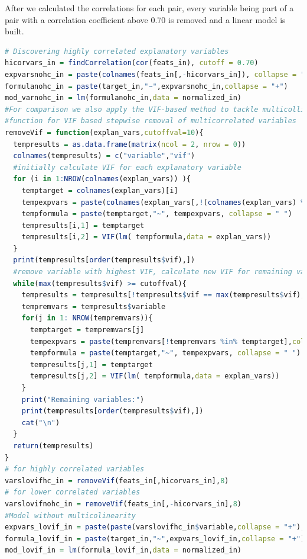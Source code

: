 \documentclass[12pt,a4paper,english]{article}
\begin{document}
After we calculated the correlations for each pair, every variable being part of a pair with a correlation coefficient above 0.70 is removed and a linear model is built.
\begin{lstlisting}[language= R, captionpos=b,caption=\href{https://github.com/jaidikam/sps_ws1718/tree/master/Qfolder3}{SPL\_Q3\_india\_impvar\_vif}]
# Discovering highly correlated explanatory variables
hicorvars_in = findCorrelation(cor(feats_in), cutoff = 0.70)
expvarsnohc_in = paste(colnames(feats_in[,-hicorvars_in]), collapse = "+")
formulanohc_in = paste(target_in,"~",expvarsnohc_in,collapse = "+")
mod_varnohc_in = lm(formulanohc_in,data = normalized_in)
#For comparison we also apply the VIF-based method to tackle multicollinearity:
#function for VIF based stepwise removal of multicorrelated variables
removeVif = function(explan_vars,cutoffval=10){
  tempresults = as.data.frame(matrix(ncol = 2, nrow = 0))
  colnames(tempresults) = c("variable","vif")
  #initially calculate VIF for each explanatory variable
  for (i in 1:NROW(colnames(explan_vars)) ){
    temptarget = colnames(explan_vars)[i]
    tempexpvars = paste(colnames(explan_vars[,!(colnames(explan_vars) %in% temptarget)]),collapse = "+")
    tempformula = paste(temptarget,"~", tempexpvars, collapse = " ")
    tempresults[i,1] = temptarget 
    tempresults[i,2] = VIF(lm( tempformula,data = explan_vars))
  }
  print(tempresults[order(tempresults$vif),])
  #remove variable with highest VIF, calculate new VIF for remaining variables until all VIF are below cutoff value
  while(max(tempresults$vif) >= cutoffval){
    tempresults = tempresults[!tempresults$vif == max(tempresults$vif),]
    tempremvars = tempresults$variable
    for(j in 1: NROW(tempremvars)){
      temptarget = tempremvars[j]
      tempexpvars = paste(tempremvars[!tempremvars %in% temptarget],collapse = "+")
      tempformula = paste(temptarget,"~", tempexpvars, collapse = " ")
      tempresults[j,1] = temptarget 
      tempresults[j,2] = VIF(lm( tempformula,data = explan_vars))
    }
    print("Remaining variables:")
    print(tempresults[order(tempresults$vif),])
    cat("\n") 
  }
  return(tempresults)
}
# for highly correlated variables
varslovifhc_in = removeVif(feats_in[,hicorvars_in],8) 
# for lower correlated variables
varslovifnohc_in = removeVif(feats_in[,-hicorvars_in],8) 
#Model without multicolinearity
expvars_lovif_in = paste(paste(varslovifhc_in$variable,collapse = "+"),"+",paste(varslovifnohc_in$variable,collapse = "+"),collapse = "+")
formula_lovif_in = paste(target_in,"~",expvars_lovif_in,collapse = "+")
mod_lovif_in = lm(formula_lovif_in,data = normalized_in)
\end{lstlisting}
\end{document}
